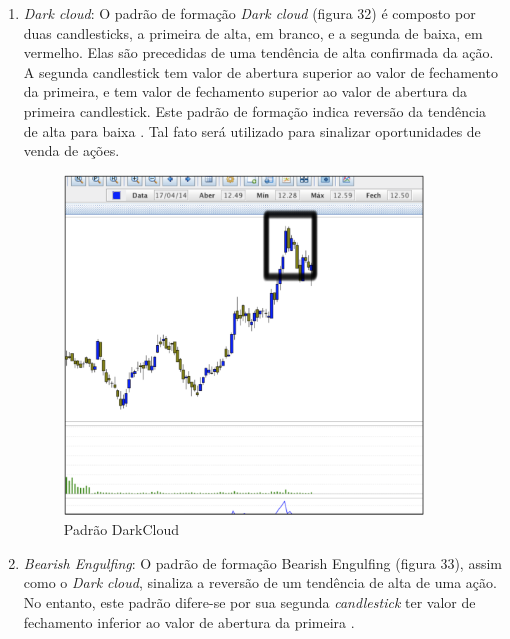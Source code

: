 \begin{description}
\begin{itemize}
\begin{enumerate}
\item \textit{Dark cloud}:\newline
O padrão de formação \textit{Dark cloud} (figura 32) é composto por duas candlesticks, a primeira de alta, em branco, e a segunda de baixa, em vermelho. Elas são precedidas de uma tendência de alta confirmada da ação. A segunda candlestick tem valor de abertura superior ao valor de fechamento da primeira, e tem valor de fechamento superior ao valor de abertura da primeira candlestick. Este padrão de formação indica reversão da tendência de alta para baixa \cite[p.61]{matsura2006}. Tal fato será utilizado para sinalizar oportunidades de venda de ações.

\begin{figure}[h!]
\centering
\label{f27}
\includegraphics[width=0.9\textwidth]{figuras/f19}
\caption{Padrão DarkCloud}
\end{figure}
\FloatBarrier
\item \textit{Bearish Engulfing}:\newline
O padrão de formação Bearish Engulfing (figura 33), assim como o \textit{Dark cloud}, sinaliza a reversão de um tendência de alta de uma ação. No entanto, este padrão difere-se por sua segunda \textit{candlestick} ter valor de fechamento inferior ao valor de abertura da primeira \cite[p. 38]{bigalow2010}.


\end{enumerate}
\end{itemize}
\end{description}
